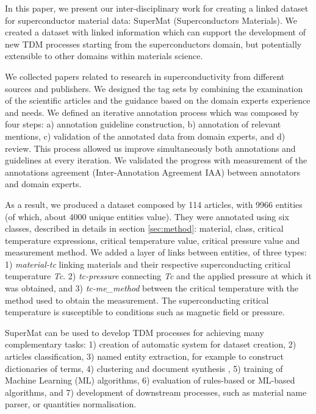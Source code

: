 \documentclass[a4paper,10pt]{article}
\begin{document}


In this paper, we present our inter-disciplinary work for creating a linked dataset for superconductor material data: SuperMat (Superconductors Materials). We created a dataset with linked information which can support the development of new TDM processes starting from the superconductors domain, but potentially extensible to other domains within materials science. 

We collected papers related to research in superconductivity from different sources and publishers.  
We designed the tag sets by combining the examination of the scientific articles and the guidance based on the domain experts experience and needs. 
We defined an iterative annotation process which was composed by four steps: a) annotation guideline construction, b) annotation of relevant mentions, c) validation of the annotated data from domain experts, and d) review. This process allowed us improve simultaneously both annotations and guidelines at every iteration. 
We validated the progress with measurement of the annotations agreement (Inter-Annotation Agreement IAA) between annotators and domain experts.

As a result, we produced a dataset composed by 114 articles, with 9966 entities (of which, about 4000 unique entities value). They were annotated using six classes, described in details in section \ref{sec:method}: material, class, critical temperature expressions, critical temperature value, critical pressure value and measurement method.
We added a layer of links between entities, of three types: 1) \textit{material-tc} linking materials and their respective superconducting critical temperature \textit{Tc}. 
2) \textit{tc-pressure} connecting \textit{Tc} and the applied pressure at which it was obtained, and 3) \textit{tc-me\_method} between the critical temperature with the method used to obtain the measurement. 
The superconducting critical temperature is susceptible to conditions such as magnetic field or pressure. 

SuperMat can be used to develop TDM processes for achieving many complementary tasks: 
1) creation of automatic system for dataset creation, 
2) articles classification, 
3) named entity extraction, for example to construct dictionaries of terms, 
4) clustering and document synthesis ,
5) training of Machine Learning (ML) algorithms,
6) evaluation of rules-based or ML-based algorithms, and 
7) development of downstream processes, such as material name parser, or quantities normalisation.
\end{document}
